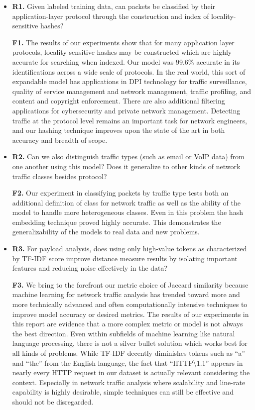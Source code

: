 \begin{itemize}
\item\textbf{R1.} Given labeled training data, can packets be classified by their application-layer protocol through the construction and index of locality-sensitive hashes?

\textbf{F1.} The results of our experiments show that for many application layer protocols, locality sensitive hashes may be constructed which are highly accurate for searching when indexed. Our model was 99.6\% accurate in its identifications across a wide scale of protocols. In the real world, this sort of expandable model has applications in DPI technology for traffic surveillance, quality of service management and network management, traffic profiling, and content and copyright enforcement. There are also additional filtering applications for cybersecurity and private network management. Detecting traffic at the protocol level remains an important task for network engineers, and our hashing technique improves upon the state of the art in both accuracy and breadth of scope.

\item\textbf{R2.} Can we also distinguish traffic types (such as email or VoIP data) from one another using this model? Does it generalize to other kinds of network traffic classes besides protocol?

\textbf{F2.} Our experiment in classifying packets by traffic type tests both an additional definition of class for network traffic as well as the ability of the model to handle more heterogeneous classes. Even in this problem the hash embedding technique proved highly accurate. This demonstrates the generalizability of the models to real data and new problems.

\item\textbf{R3.} For payload analysis, does using only high-value tokens as characterized by TF-IDF score improve distance measure results by isolating important features and reducing noise effectively in the data?

\textbf{F3.} We bring to the forefront our metric choice of Jaccard similarity because machine learning for network traffic analysis has trended toward more and more technically advanced and often computationally intensive techniques to improve model accuracy or desired metrics. The results of our experiments in this report are evidence that a more complex metric or model is not always the best direction. Even within subfields of machine learning like natural language processing, there is not a silver bullet solution which works best for all kinds of problems. While TF-IDF decently diminishes tokens such as ``a'' and ``the'' from the English language, the fact that ``\textsc{HTTP\textbackslash1.1}'' appears in nearly every HTTP request in our dataset is actually relevant considering the context. Especially in network traffic analysis where scalability and line-rate capability is highly desirable, simple techniques can still be effective and should not be disregarded.


\end{itemize}
